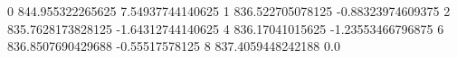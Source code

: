 0 844.955322265625 7.54937744140625
1 836.522705078125 -0.88323974609375
2 835.7628173828125 -1.64312744140625
4 836.17041015625 -1.23553466796875
6 836.8507690429688 -0.55517578125
8 837.4059448242188 0.0
